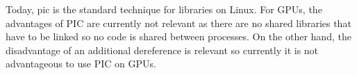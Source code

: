 Today, \gls{pic} is the standard technique for libraries on Linux. For GPUs, the advantages of PIC are currently not relevant as there are no shared libraries that have to be linked so no code is shared between processes. On the other hand, the disadvantage of an additional dereference is relevant so currently it is not advantageous to use PIC on GPUs.